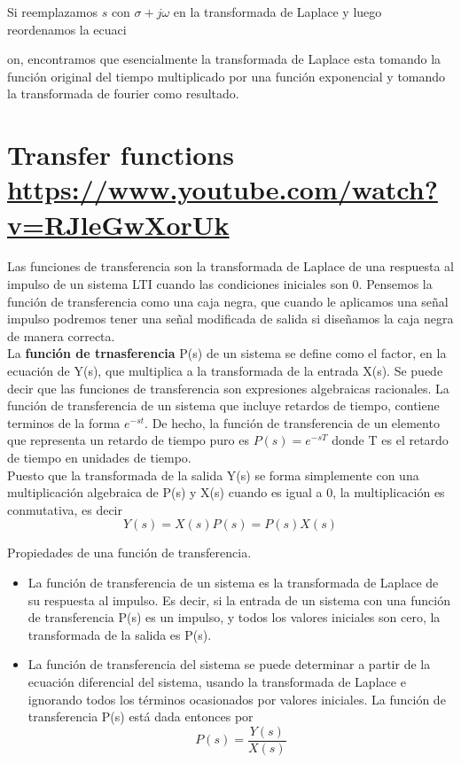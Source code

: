 \documentclass[
	12pt, %
]{fphw}
\begin{document}
Si reemplazamos $s$ con $\sigma +  j\omega$ en la transformada de Laplace y luego reordenamos la ecuaci{on, encontramos que esencialmente la transformada de Laplace esta tomando la función original del tiempo multiplicado por una función exponencial y tomando la transformada de fourier como resultado.  

\newpage
\section*{{\color{RoyalPurple}Transfer functions} \url{https://www.youtube.com/watch?v=RJleGwXorUk}}

Las funciones de transferencia son la transformada de Laplace de una respuesta al impulso de un sistema LTI cuando las condiciones iniciales son $0$. Pensemos la función de transferencia como una caja negra, que cuando le aplicamos una señal impulso podremos tener una señal modificada de salida si diseñamos la caja negra de manera correcta. \\

La \textbf{función de trnasferencia} P(s) de un sistema se define como el factor, en la ecuación de Y(s), que multiplica a la transformada de la entrada X(s). Se puede decir que las funciones de transferencia son expresiones algebraicas racionales. La función de transferencia de un sistema que incluye retardos de tiempo, contiene terminos de la forma $e^{-st}$. De hecho, la función de transferencia de un elemento que representa un retardo de tiempo puro es $P(s) =e^{-sT}$ donde T es el retardo de tiempo en unidades de tiempo. \\

Puesto que la transformada de la salida Y(s) se forma simplemente con una multiplicación algebraica de P(s) y X(s) cuando es igual a 0, la multiplicación es conmutativa, es decir
\[Y(s)=X(s)P(s) = P(s)X(s)\]

Propiedades de una función de transferencia.

\begin{itemize}
\item La función de transferencia de un sistema es la transformada de Laplace de su respuesta al impulso. Es decir, si la entrada de un sistema con una función de transferencia P(s) es un impulso, y todos los valores iniciales son cero, la transformada de la salida es P(s).
\item La función de transferencia del sistema se puede determinar a partir de la ecuación diferencial del sistema, usando la transformada de Laplace e ignorando todos los términos ocasionados por valores iniciales. La función de transferencia P(s) está dada entonces por \[P(s)=\frac{Y(s)}{X(s)}\]


\end{itemize}}
\end{document}
